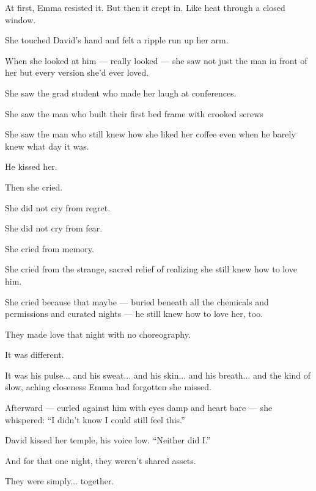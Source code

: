 At first, Emma resisted it. But then it crept in. Like heat through 
a closed window.

She touched David’s hand and felt a ripple run up her arm. 

When she looked at him --- really looked --- she saw not just the man in front of her but every 
version she’d ever loved.

She saw the grad student who made her laugh at conferences.

She saw the man who built their first bed frame with crooked screws

She saw the man who still knew how she liked her coffee even when he barely knew what day it was.

He kissed her.

Then she cried.

She did not cry from regret. 

She did not cry from fear.

She cried from memory.

She cried from the strange, sacred relief of realizing she still knew how to love him.

She cried because that maybe --- buried beneath all the chemicals and permissions and curated nights --- 
he still knew how to love her, too.

They made love that night with no choreography. 

It was different.

It was his pulse... and his sweat... and his skin... and his breath... and the kind of slow, 
aching closeness Emma had forgotten she missed.

Afterward --- curled against him with eyes damp and heart bare --- she whispered:
``I didn’t know I could still feel this.''

David kissed her temple, his voice low.
``Neither did I.''

And for that one night, they weren't shared assets.

They were simply... together.

